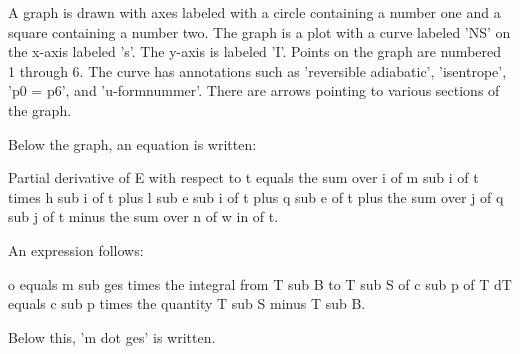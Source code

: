 A graph is drawn with axes labeled with a circle containing a number one and a square containing a number two. The graph is a plot with a curve labeled 'NS' on the x-axis labeled 's'. The y-axis is labeled 'I'. Points on the graph are numbered 1 through 6. The curve has annotations such as 'reversible adiabatic', 'isentrope', 'p0 = p6', and 'u-formnummer'. There are arrows pointing to various sections of the graph.

Below the graph, an equation is written:

Partial derivative of E with respect to t equals the sum over i of m sub i of t times h sub i of t plus l sub e sub i of t plus q sub e of t plus the sum over j of q sub j of t minus the sum over n of w in of t.

An expression follows:

o equals m sub ges times the integral from T sub B to T sub S of c sub p of T dT equals c sub p times the quantity T sub S minus T sub B.

Below this, 'm dot ges' is written.